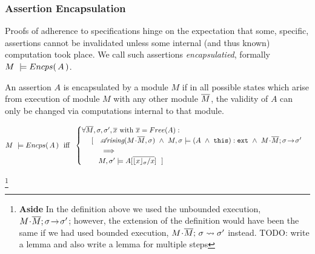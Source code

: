 \subsubsection {Assertion Encapsulation}
\label{s:encaps-proof}

{
Proofs of adherence to {\SpecLang specifications  hinge on the expectation that some, 
specific, assertions cannot be invalidated unless some 
} internal (and thus known) computation took place. 
{We call such assertions   \emph{encapsulatied},}
}
formally $M\ \models  {\ensuremath Encps(\, A\, )}$.
 


{An assertion $A$  is  encapsulated by a module $M$  if in all possible states which arise from execution of module $M$ with any other  module $\overline{M}$, the validity of $A$}  {can only be changed via computations internal to that module}.
 

\begin{definition} $~$ \\
\label{def:encapsulation}
$ %
    M\ \models \encaps{A}\ \   \mbox{iff}  \ \   
    \begin{cases}
     \forall \Mtwo, \sigma, \sigma', \overline{x} \mbox{ with } \overline{x}=Free(A):\\
   \ \ \ \  [\ \ \  \arising{M\madd\Mtwo}{\sigma}\ \wedge \  \satisfiesA{M}{\sigma}{(A \ \wedge\ \external {\prg{this})}}\  \wedge\  \leadstoOrig  {M\madd\Mtwo}  {\sigma}{\sigma'}\\
    \ \ \ \ \ \   \ \ \ \Longrightarrow\\
    \ \ \ \ \ \  \  {M},{\sigma'}\models{A[{\overline {{\interpret \sigma x}/x}}]} \ \  ]
    \end{cases}
 $%
  \end{definition}
 \footnote{\textbf{Aside} In the definition above we used the unbounded execution,  $M\!\cdot\!\overline{M};\sigma\! \rightarrow\! {\sigma'}$;  however, the extension of the definition would have been the same if we had used bounded execution, $M\!\cdot\!\overline{M};\, {\sigma} \rightsquigarrow \sigma'$ instead. TODO: write a lemma and also write a lemma for multiple steps}
 
